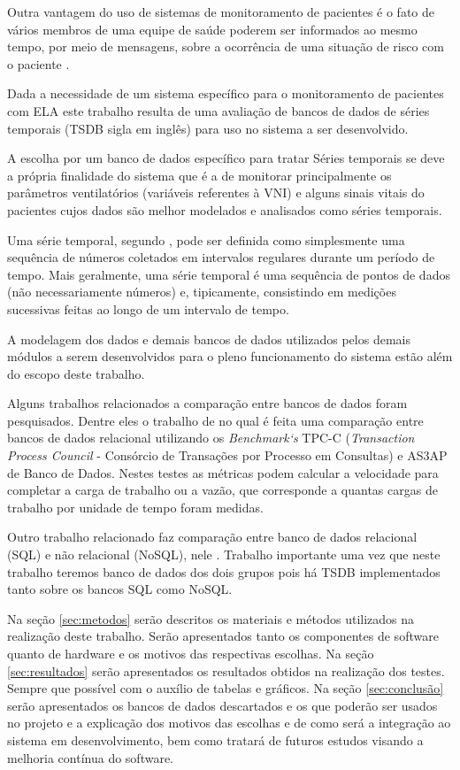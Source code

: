 \documentclass[conference,harvard,brazil,english]{sbatex}
\begin{document}
Outra vantagem do uso de sistemas de monitoramento de pacientes é o fato de vários  membros  de  uma  equipe  de saúde poderem ser informados ao mesmo tempo, por meio de mensagens, sobre a ocorrência de  uma  situação  de  risco  com  o  paciente \cite{morais2015fuzzy}.

Dada a necessidade de um sistema específico para o monitoramento de pacientes com ELA este trabalho resulta de uma avaliação de bancos de dados de séries temporais (TSDB sigla em inglês) para uso no sistema a ser desenvolvido.

A escolha por um banco de dados específico para tratar Séries temporais se deve a própria finalidade do sistema que é a de monitorar principalmente os parâmetros ventilatórios  (variáveis referentes à VNI) e alguns sinais vitais do pacientes cujos dados são melhor modelados e analisados como séries temporais.

Uma série temporal, segundo \cite{namiot2015time}, pode ser definida como simplesmente uma sequência de números coletados em intervalos regulares  durante um período de tempo. Mais geralmente, uma série temporal é uma sequência de pontos de dados (não necessariamente números) e, tipicamente, consistindo em medições sucessivas feitas ao longo de um intervalo de tempo.

A modelagem dos dados e demais bancos de dados utilizados pelos demais módulos a serem desenvolvidos para o pleno funcionamento do sistema estão além do escopo deste trabalho.

Alguns trabalhos relacionados a comparação entre bancos de dados foram pesquisados. Dentre eles o trabalho de \cite{ferreira2015analise} no qual é feita uma comparação entre bancos de dados relacional utilizando os \textit{Benchmark‘s} TPC-C (\textit{Transaction Process Council} - Consórcio de Transações por Processo em Consultas) e AS3AP de Banco de Dados. Nestes testes as métricas podem calcular a velocidade para completar a carga de trabalho ou a vazão, que corresponde a quantas cargas de trabalho por unidade de tempo foram medidas.

Outro trabalho relacionado faz comparação entre banco de dados relacional (SQL) e não relacional (NoSQL), nele \cite{garcia2019comparativo}. Trabalho importante uma vez que neste trabalho teremos banco de dados dos dois grupos pois há TSDB implementados tanto sobre os bancos SQL como NoSQL.

Na seção \ref{sec:metodos} serão descritos os materiais e métodos utilizados na realização deste trabalho. Serão apresentados tanto os componentes de software quanto de hardware e os motivos das respectivas escolhas.
Na seção \ref{sec:resultados} serão apresentados os resultados obtidos na realização dos testes. Sempre que possível com o auxílio de tabelas e gráficos.
Na seção \ref{sec:conclusão} serão apresentados os bancos de dados descartados e os que poderão ser usados no projeto e a explicação dos motivos das escolhas e de como será a integração ao sistema em desenvolvimento, bem como tratará de futuros estudos visando a melhoria contínua do software.
\end{document}
